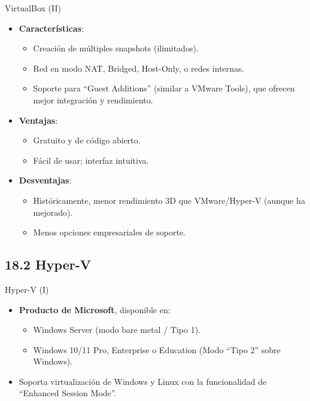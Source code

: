 \documentclass{beamer}
\begin{document}
\begin{frame}{VirtualBox (II)}
    \begin{itemize}
        \item \textbf{Características}:
            \begin{itemize}
                \item Creación de múltiples snapshots (ilimitados).
                \item Red en modo NAT, Bridged, Host-Only, o redes internas.
                \item Soporte para “Guest Additions” (similar a VMware Tools), que ofrecen mejor integración y rendimiento.
            \end{itemize}
        \item \textbf{Ventajas}:
            \begin{itemize}
                \item Gratuito y de código abierto.
                \item Fácil de usar; interfaz intuitiva.
            \end{itemize}
        \item \textbf{Desventajas}:
            \begin{itemize}
                \item Históricamente, menor rendimiento 3D que VMware/Hyper-V (aunque ha mejorado).
                \item Menos opciones empresariales de soporte.
            \end{itemize}
    \end{itemize}
\end{frame}

\subsection{18.2 Hyper-V}
\begin{frame}{Hyper-V (I)}
    \begin{itemize}
        \item \textbf{Producto de Microsoft}, disponible en:
            \begin{itemize}
                \item Windows Server (modo bare metal / Tipo 1).
                \item Windows 10/11 Pro, Enterprise o Education (Modo “Tipo 2” sobre Windows).
            \end{itemize}
        \item Soporta virtualización de Windows y Linux con la funcionalidad de “Enhanced Session Mode”.
    \end{itemize}
\end{frame}
\end{document}
